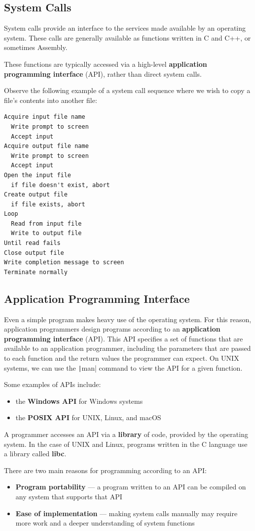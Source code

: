 \documentclass{article}
\begin{document}
\subsection{System Calls}
System calls provide an interface to the services made available by an operating system.
These calls are generally available as functions written in C and C++, or sometimes Assembly.

These functions are typically accessed via a high-level \textbf{application programming interface} (API),
rather than direct system calls.

Observe the following example of a system call sequence where we wish to copy a file's contents into another file:
\begin{verbatim}
Acquire input file name
  Write prompt to screen
  Accept input
Acquire output file name
  Write prompt to screen
  Accept input
Open the input file
  if file doesn't exist, abort
Create output file
  if file exists, abort
Loop
  Read from input file
  Write to output file
Until read fails
Close output file
Write completion message to screen
Terminate normally
\end{verbatim}
\subsection{Application Programming Interface}
Even a simple program makes heavy use of the operating system.
For this reason, application programmers design programs according to an
\textbf{application programming interface} (API). This API specifies a set of functions
that are available to an application programmer, including the parameters that are passed to each function
and the return values the programmer can expect. On UNIX systems, we can use the \texttt|man|
command to view the API for a given function.

Some examples of APIs include:
\begin{itemize}
    \item the \textbf{Windows API} for Windows systems
    \item the \textbf{POSIX API} for UNIX, Linux, and macOS
\end{itemize}
A programmer accesses an API via a \textbf{library} of code, provided by the operating system.
In the case of UNIX and Linux, programs written in the C language use a library called \textbf{libc}.

There are two main reasons for programming according to an API:
\begin{itemize}
    \item \textbf{Program portability} --- a program written to an API can be compiled on any system that supports that API
    \item \textbf{Ease of implementation} --- making system calls manually may require more work and a deeper understanding of system functions
\end{itemize}
\end{document}
